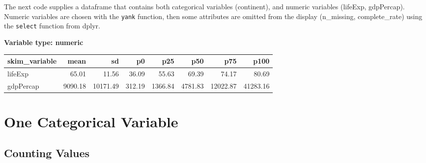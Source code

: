 \documentclass[]{book}
\newenvironment{Shaded}{\begin{snugshade}}{\end{snugshade}}
\newcommand{\KeywordTok}[1]{\textcolor[rgb]{0.13,0.29,0.53}{\textbf{#1}}}
\newcommand{\DecValTok}[1]{\textcolor[rgb]{0.00,0.00,0.81}{#1}}
\newcommand{\StringTok}[1]{\textcolor[rgb]{0.31,0.60,0.02}{#1}}
\newcommand{\OperatorTok}[1]{\textcolor[rgb]{0.81,0.36,0.00}{\textbf{#1}}}
\newcommand{\NormalTok}[1]{#1}
\begin{document}
The next code supplies a dataframe that contains both categorical
variables (continent), and numeric variables (lifeExp, gdpPercap).
Numeric variables are chosen with the \texttt{yank} function, then some
attributes are omitted from the display (n\_missing, complete\_rate)
using the \texttt{select} function from dplyr.

\begin{Shaded}
\end{Shaded}

\textbf{Variable type: numeric}

\begin{tabular}{l|r|r|r|r|r|r|r}
\hline
skim\_variable & mean & sd & p0 & p25 & p50 & p75 & p100\\
\hline
lifeExp & 65.01 & 11.56 & 36.09 & 55.63 & 69.39 & 74.17 & 80.69\\
\hline
gdpPercap & 9090.18 & 10171.49 & 312.19 & 1366.84 & 4781.83 & 12022.87 & 41283.16\\
\hline
\end{tabular}

\section{One Categorical Variable}\label{one-categorical-variable}

\subsection{Counting Values}\label{counting-values}
\end{document}
